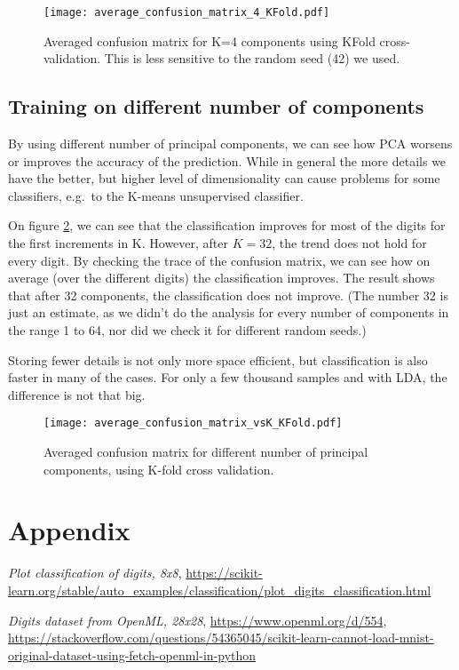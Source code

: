 \documentclass{article}
\begin{document}
\begin{figure}[ht!]
    \centering
    \texttt{[image: average\_confusion\_matrix\_4\_KFold.pdf]}
    \caption{Averaged confusion matrix for K=4 components using KFold cross-validation.
        This is less sensitive to the random seed (42) we used.}
    \label{fig:confusion_matrix_4_kfold}
\end{figure}

\subsection{Training on different number of components}
By using different number of principal components,
we can see how PCA worsens or improves the accuracy of the prediction.
While in general the more details we have the better,
but higher level of dimensionality can cause problems for some classifiers,
e.g.\ to the K-means unsupervised classifier.

On figure \ref{fig:confusion_matrix_4_kfold_K},
we can see that the classification improves for most of the digits for the first increments in K.
However, after $K=32$, the trend does not hold for every digit.
By checking the trace of the confusion matrix, we can see how on average (over the different digits)
the classification improves.
The result shows that after 32 components, the classification does not improve.
(The number 32 is just an estimate,
as we didn't do the analysis for every number of components in the range 1 to 64,
nor did we check it for different random seeds.)

Storing fewer details is not only more space efficient,
but classification is also faster in many of the cases.
For only a few thousand samples and with LDA, the difference is not that big.


\begin{figure}[ht!]
    \centering
    \texttt{[image: average\_confusion\_matrix\_vsK\_KFold.pdf]}
    \caption{Averaged confusion matrix for different number of principal components,
        using K-fold cross validation.}
    \label{fig:confusion_matrix_4_kfold_K}
\end{figure}


\clearpage
\section{Appendix}

\begin{thebibliography}{9}
    \textit{Plot classification of digits, 8x8},
    \url{https://scikit-learn.org/stable/auto_examples/classification/plot_digits_classification.html}

    \textit{Digits dataset from OpenML, 28x28},
    \url{https://www.openml.org/d/554},
    \url{https://stackoverflow.com/questions/54365045/scikit-learn-cannot-load-mnist-original-dataset-using-fetch-openml-in-python}
\end{thebibliography}
\end{document}
